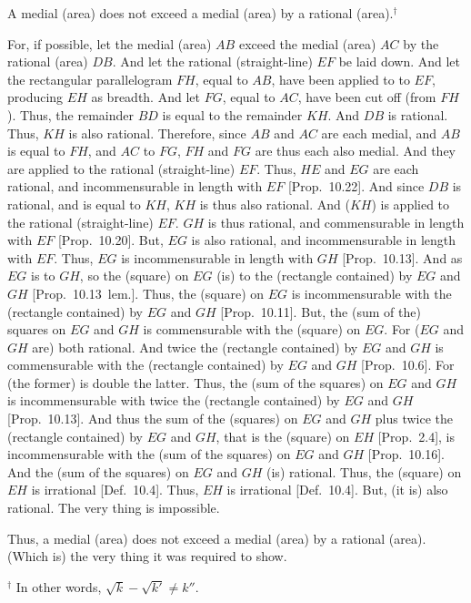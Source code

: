 \begin{Parallel}{}{}
{A medial (area) does not exceed a medial
(area) by a rational (area).$^\dag$

\epsfysize=1.8in
\centerline{}

For, if possible, let the medial (area) $AB$ exceed the medial (area) $AC$
by the rational (area) $DB$. And let the rational (straight-line)
$EF$ be laid down. And let the rectangular parallelogram $FH$, equal to $AB$, have been
applied to to $EF$, producing $EH$ as breadth. And let $FG$, equal to
$AC$, have been cut off (from $FH$). Thus, the remainder $BD$
is equal to the remainder $KH$. And $DB$ is rational. Thus, $KH$
is also rational. Therefore, since $AB$ and $AC$ are each medial, and
$AB$ is equal to $FH$, and $AC$ to $FG$, $FH$ and $FG$ are thus each also medial. And they are applied to the rational (straight-line)
$EF$. Thus, $HE$ and $EG$ are each rational, and incommensurable
in length with $EF$ [Prop.~10.22]. 
And since $DB$ is rational, and is equal to $KH$, $KH$ is thus  also
rational. And ($KH$) is  applied to the rational (straight-line)
$EF$. $GH$ is thus rational, and commensurable in length with
$EF$ [Prop.~10.20]. But, $EG$ is also
rational, and incommensurable in length with $EF$. Thus, $EG$ is
incommensurable in length with $GH$ [Prop.~10.13]. And as $EG$ is to $GH$, so the
(square) on $EG$ (is) to the (rectangle contained) by $EG$ and
$GH$ [Prop.~10.13~lem.]. Thus, the (square)
on $EG$ is incommensurable with the (rectangle contained) by 
$EG$ and $GH$ [Prop.~10.11]. 
But, the (sum of the) squares on $EG$ and $GH$ is commensurable with
the (square) on $EG$. For ($EG$ and $GH$ are) both rational.
And twice the (rectangle contained) by $EG$ and $GH$ is commensurable
with the (rectangle contained) by $EG$ and $GH$ [Prop.~10.6]. For (the former) is double the latter.
Thus, the (sum of the squares) on $EG$ and $GH$ is incommensurable
with twice the (rectangle contained) by $EG$ and $GH$
[Prop.~10.13]. 
And thus the sum of the (squares) on $EG$ and $GH$ plus twice the (rectangle contained) by
$EG$ and $GH$, that is the (square) on $EH$ [Prop.~2.4], is incommensurable with the (sum
of the squares) on $EG$ and $GH$ [Prop.~10.16].
And the (sum of the squares) on $EG$ and $GH$ (is) rational. 
Thus, the (square) on $EH$ is irrational [Def.~10.4].
Thus, $EH$ is irrational  [Def.~10.4]. But,
(it is) also rational. The very thing is impossible.

Thus, a medial (area) does not exceed a medial
(area) by a rational (area). (Which is) the very thing it was required to show.}
\end{Parallel}
{\footnotesize\noindent$^\dag$ In other words, $\sqrt{k}-\sqrt{k'}\neq k''$.}

